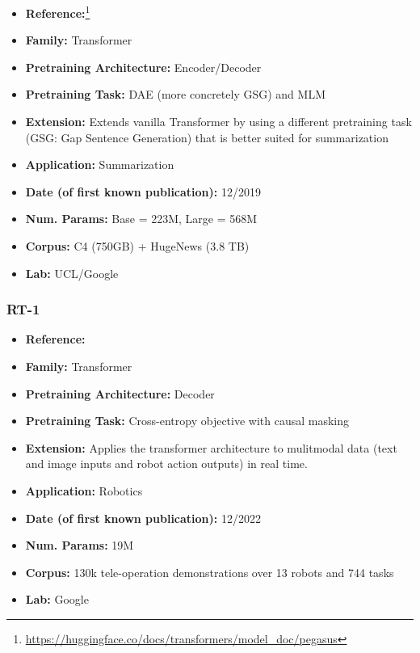 \documentclass{article}
\begin{document}
            \begin{itemize}
                \item \textbf{Reference:}\footnote{\url{https://huggingface.co/docs/transformers/model_doc/pegasus}}\cite{zhang2020pegasus}
                \item \textbf{Family:}  Transformer
                \item \textbf{Pretraining Architecture:} Encoder/Decoder
                \item \textbf{Pretraining Task:} DAE (more concretely GSG) and MLM
                \item \textbf{Extension:} Extends vanilla Transformer by using a different pretraining task (GSG: Gap Sentence Generation) that is better suited for summarization  
                \item \textbf{Application:} Summarization
                \item \textbf{Date (of first known publication):} 12/2019
                \item \textbf{Num. Params:} Base = 223M, Large = 568M
                \item \textbf{Corpus:} C4 (750GB) + HugeNews (3.8 TB)
                \item \textbf{Lab:} UCL/Google
            \end{itemize}

\subsubsection{RT-1}

            \begin{itemize}
                \item \textbf{Reference:}\cite{brohan2022rt}
                \item \textbf{Family:} Transformer
                \item \textbf{Pretraining Architecture:} Decoder
                \item \textbf{Pretraining Task:} Cross-entropy objective with causal masking
                \item \textbf{Extension:} Applies the transformer architecture to mulitmodal data (text and image inputs and robot action outputs) in real time.
                \item \textbf{Application:} Robotics
                \item \textbf{Date (of first known publication):} 12/2022
                \item \textbf{Num. Params:} 19M
                \item \textbf{Corpus:} 130k tele-operation demonstrations over 13 robots and 744 tasks
                \item \textbf{Lab:} Google
            \end{itemize}
\end{document}
